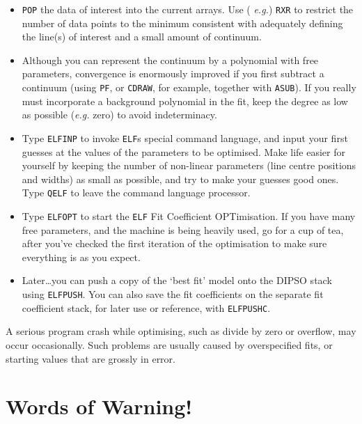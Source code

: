 \documentclass[twoside,11pt]{article}
\newcommand{\htmlref}[2]{#1}
\renewcommand{\_}{\texttt{\symbol{95}}}
\begin{document}
\begin{itemize}

\item \htmlref{{\tt{POP}}}{COM:POP}  the data of interest into the current arrays. Use ({\em
e.g.}) \htmlref{{\tt{RXR}}}{COM:RXR}  to restrict the number of data points to the minimum
consistent with adequately defining the line(s) of interest and a
small amount of continuum.

\item Although you can represent the continuum by a polynomial with
free parameters, convergence is enormously improved if you first
subtract a continuum (using \htmlref{{\tt{PF}}}{COM:PF},  or \htmlref{{\tt{CDRAW}}}{COM:CDRAW},  for example,
together with \htmlref{{\tt{ASUB}}}{COM:ASUB}).  If you really must incorporate a background
polynomial in the fit, keep the degree as low as possible ({\em e.g.}
zero) to avoid indeterminacy.

\item Type \htmlref{{\tt{ELFINP}}}{COM:ELFINP}  to invoke {\tt{ELF}}s  special command language,
and input your first guesses at the values of the parameters to be
optimised. Make life easier for yourself by keeping the number of
non-linear parameters (line centre positions and widths) as small as
possible, and try to make your guesses good ones. Type {\tt{QELF}}  to
leave the command language processor.

\item Type \htmlref{{\tt{ELFOPT}}}{COM:ELFOPT}  to start the {\tt{ELF}}  Fit Coefficient
OPTimisation. If you have many free parameters, and the machine is
being heavily used, go for a cup of tea, after you've checked the
first iteration of the optimisation to make sure everything is as you
expect.

\item Later\ldots you can push a copy of the `best fit' model onto the
DIPSO stack using \htmlref{{\tt{ELFPUSH}}}{COM:ELFPUSH}.  You can also save the fit
coefficients on the separate fit coefficient stack, for later use or
reference, with \htmlref{{\tt{ELFPUSHC}}}{COM:ELFPUSHC}. 

\end{itemize}

A serious program crash while optimising, such as divide by zero or
overflow, may occur occasionally. Such problems are usually caused by
overspecified fits, or starting values that are grossly in error.

\section {Words of Warning!}
\end{document}
